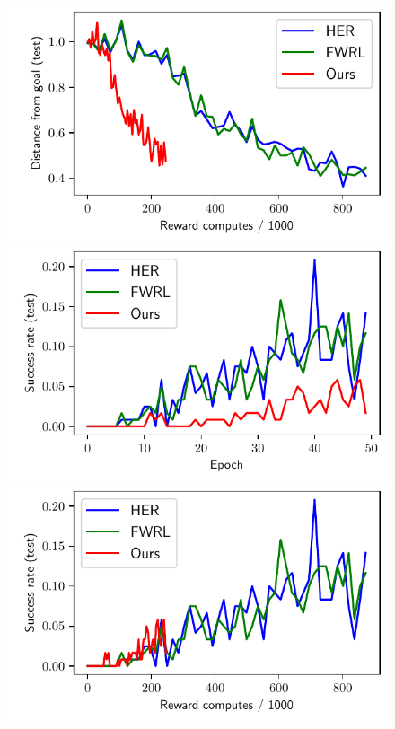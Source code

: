 \begin{figure}
  \includegraphics[width=\frac\columnwidth]{media/res/6efc1de-path_reward_low_thresh_chosen-HandManipulateEggFullPR-v0-dqst/reward_computes-test/ag_g_dist.pdf}%
  \includegraphics[width=\frac\columnwidth]{media/res/6efc1de-path_reward_low_thresh_chosen-HandManipulateEggFullPR-v0-dqst/epoch-test/success_rate.pdf}%
  \includegraphics[width=\frac\columnwidth]{media/res/6efc1de-path_reward_low_thresh_chosen-HandManipulateEggFullPR-v0-dqst/reward_computes-test/success_rate.pdf}\\

\end{figure}

